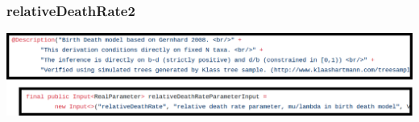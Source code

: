 \documentclass{beamer}
\begin{document}
\begin{frame}
  \frametitle{relativeDeathRate2}

  
  \includegraphics[height=0.3\textheight]{relativeDeathRate2_documentation.png}

  

\end{frame}
\end{document}

